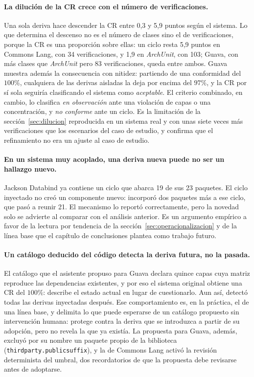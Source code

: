\paragraph{La dilución de la CR crece con el número de verificaciones.} Una sola deriva hace descender la CR entre 0,3 y 5,9 puntos según el sistema. Lo que determina el descenso no es el número de clases sino el de verificaciones, porque la CR es una proporción sobre ellas: un ciclo resta 5,9 puntos en Commons Lang, con 34 verificaciones, y 1,9 en \textit{ArchUnit}, con 103; Guava, con más clases que \textit{ArchUnit} pero 83 verificaciones, queda entre ambos. Guava muestra además la consecuencia con nitidez: partiendo de una conformidad del $100\%$, cualquiera de las derivas aisladas la deja por encima del $97\%$, y la CR por sí sola seguiría clasificando el sistema como \textit{aceptable}. El criterio combinado, en cambio, lo clasifica \textit{en observación} ante una violación de capas o una concentración, y \textit{no conforme} ante un ciclo. Es la limitación de la sección~\ref{sec:dilucion} reproducida en un sistema real y con unas siete veces más verificaciones que los escenarios del caso de estudio, y confirma que el refinamiento no era un ajuste al caso de estudio.

\paragraph{En un sistema muy acoplado, una deriva nueva puede no ser un hallazgo nuevo.} Jackson Databind ya contiene un ciclo que abarca 19 de sus 23 paquetes. El ciclo inyectado no creó un componente nuevo: incorporó dos paquetes más a ese ciclo, que pasó a reunir 21. El mecanismo lo reportó correctamente, pero la novedad solo se advierte al comparar con el análisis anterior. Es un argumento empírico a favor de la lectura por tendencia de la sección~\ref{sec:operacionalizacion} y de la línea base que el capítulo de conclusiones plantea como trabajo futuro.

\paragraph{Un catálogo deducido del código detecta la deriva futura, no la pasada.} El catálogo que el asistente propuso para Guava declara quince capas cuya matriz reproduce las dependencias existentes, y por eso el sistema original obtiene una CR del $100\%$: describe el estado actual en lugar de cuestionarlo. Aun así, detectó todas las derivas inyectadas después. Ese comportamiento es, en la práctica, el de una línea base, y delimita lo que puede esperarse de un catálogo propuesto sin intervención humana: protege contra la deriva que se introduzca a partir de su adopción, pero no revela la que ya existía. La propuesta para Guava, además, excluyó por su nombre un paquete propio de la biblioteca (\texttt{thirdparty.publicsuffix}), y la de Commons Lang activó la revisión determinista del umbral, dos recordatorios de que la propuesta debe revisarse antes de adoptarse.

